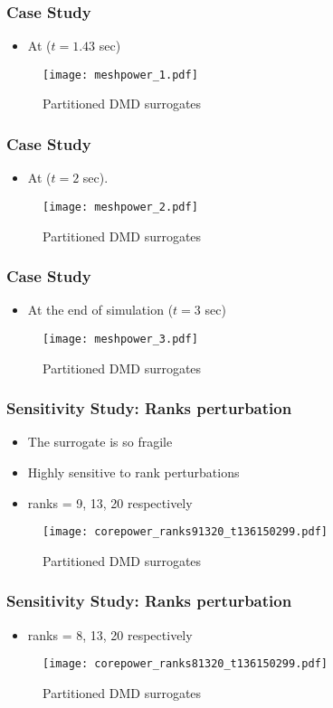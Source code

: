 \documentclass[fleqn]{beamer}
\begin{document}
\begin{frame}
\frametitle{Case Study}
\begin{itemize}
	\item At ($t=1.43$ sec)
\end{itemize}
\begin{figure}[ht]
\texttt{[image: meshpower\_1.pdf]}
\caption{Partitioned DMD surrogates}
\end{figure}
\end{frame}

\begin{frame}
\frametitle{Case Study}
\begin{itemize}
	\item At ($t=2$ sec).
\end{itemize}
\begin{figure}
\texttt{[image: meshpower\_2.pdf]}
\caption{Partitioned DMD surrogates}
\end{figure}
\end{frame}

\begin{frame}
\frametitle{Case Study}
\begin{itemize}
	\item At the end of simulation ($t=3$ sec)
\end{itemize}
\begin{figure}[ht]
\texttt{[image: meshpower\_3.pdf]}
\caption{Partitioned DMD surrogates}
\end{figure}
\end{frame}

\begin{frame}
\frametitle{Sensitivity Study: Ranks perturbation}
\begin{itemize}
 \item The surrogate is so fragile
 \item Highly sensitive to rank perturbations
 \item ranks = 9, 13, 20 respectively
\end{itemize}

\begin{figure}[ht]

\texttt{[image: corepower\_ranks91320\_t136150299.pdf]}
\caption{Partitioned DMD surrogates}
\end{figure}
\end{frame}

\begin{frame}
\frametitle{Sensitivity Study: Ranks perturbation}
\begin{itemize}
 \item ranks = 8, 13, 20 respectively
\end{itemize}
\begin{figure}[ht]
\texttt{[image: corepower\_ranks81320\_t136150299.pdf]}
\caption{Partitioned DMD surrogates}
\end{figure}
\end{frame}
\end{document}
